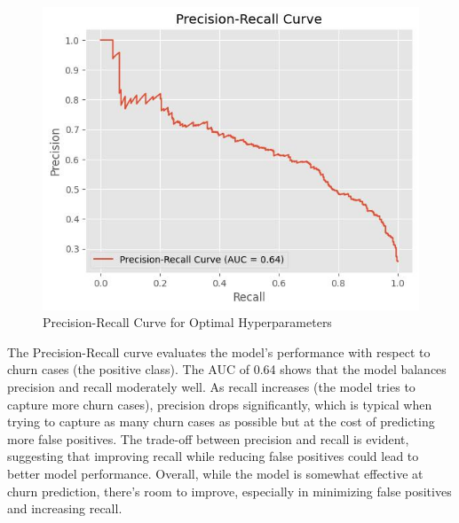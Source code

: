 \begin{figure}[hbt!]
    \centering
    \includegraphics[width=1\linewidth]{Images/5.7.5.a.jpg}
    \caption{Precision-Recall Curve for Optimal Hyperparameters}
    \label{fig:enter-label}
\end{figure}

The Precision-Recall curve evaluates the model's performance with respect to churn cases (the positive class). The AUC of 0.64 shows that the model balances precision and recall moderately well. As recall increases (the model tries to capture more churn cases), precision drops significantly, which is typical when trying to capture as many churn cases as possible but at the cost of predicting more false positives. The trade-off between precision and recall is evident, suggesting that improving recall while reducing false positives could lead to better model performance. Overall, while the model is somewhat effective at churn prediction, there's room to improve, especially in minimizing false positives and increasing recall.

